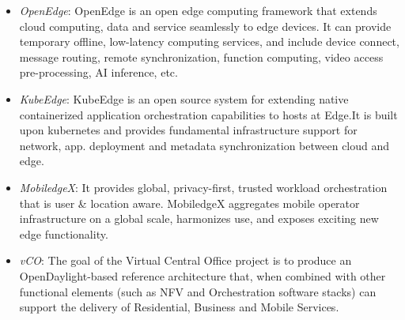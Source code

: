 \begin{itemize}
\item \textit{\textit{OpenEdge}}: OpenEdge is an open edge computing framework that extends cloud computing, data and service seamlessly to edge devices. It can provide temporary offline, low-latency computing services, and include device connect, message routing, remote synchronization, function computing, video access pre-processing, AI inference, etc.

\item \textit{\textit{KubeEdge}}: KubeEdge is an open source system for extending native containerized application orchestration capabilities to hosts at Edge.It is built upon kubernetes and provides fundamental infrastructure support for network, app. deployment and metadata synchronization between cloud and edge.

\item \textit{\textit{MobiledgeX}}: It provides global, privacy-first, trusted workload orchestration that is user \& location aware. MobiledgeX aggregates mobile operator infrastructure on a global scale, harmonizes use, and exposes exciting new edge functionality. 

\item \textit{\textit{vCO}}: The goal of the Virtual Central Office project is to produce an OpenDaylight-based reference architecture that, when combined with other functional elements (such as NFV
and Orchestration software stacks) can support the delivery of Residential, Business and Mobile Services. 

\end{itemize}

